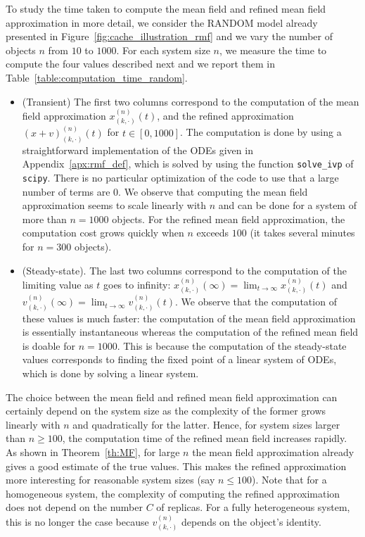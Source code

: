 \documentclass[acmsmall]{acmart}
\newcommand\toN{^{(n)}}
\begin{document}
To study the time taken to compute the mean field and refined mean field approximation in more detail, we consider the RANDOM model already presented in Figure~\ref{fig:cache_illustration_rmf} and we vary the number of objects $n$ from $10$ to $1000$. For each system size $n$, we measure the time to compute the four values described next and we report them in Table~\ref{table:computation_time_random}. 
\begin{itemize}[wide, labelwidth=!, labelindent=0pt]
  \item (Transient) The first two columns correspond to the computation of the mean field approximation $x\toN_{(k,\cdot)}(t)$, and the refined approximation $(x+v)\toN_{(k,\cdot)}(t)$ for $t\in[0,1000]$. The computation is done by using a straightforward implementation of the ODEs given in Appendix~\ref{apx:rmf_def}, which is solved by using the function \texttt{solve\_ivp} of \texttt{scipy}. There is no particular optimization of the code to use that a large number of terms are $0$. We observe that computing the mean field approximation seems to scale linearly with $n$ and can be done for a system of more than $n=1000$ objects. For the refined mean field approximation, the computation cost grows quickly when $n$ exceeds $100$ (it takes several minutes for $n=300$ objects).
  \item (Steady-state). The last two columns correspond to the computation of the limiting value as $t$ goes to infinity: $x\toN_{(k,\cdot)}(\infty) = \lim_{t\to\infty}x\toN_{(k,\cdot)}(t)$ and $v\toN_{(k,\cdot)}(\infty) = \lim_{t\to\infty}v\toN_{(k,\cdot)}(t)$. We observe that the computation of these values is much faster: the computation of the mean field approximation is essentially instantaneous whereas the computation of the refined mean field is doable for $n=1000$. This is because the computation of the steady-state values corresponds to finding the fixed point of a linear system of ODEs, which is done by solving a linear system.
\end{itemize}

The choice between the mean field and refined mean field approximation can certainly depend on the system size as the complexity of the former grows linearly with $n$ and quadratically for the latter. Hence, for system sizes larger than $n\ge 100$, the computation time of the refined mean field increases rapidly. As shown in Theorem~\ref{th:MF}, for large $n$ the mean field approximation already gives a good estimate of the true values. This makes the refined approximation more interesting for reasonable system sizes (say $n\le100$). Note that for a homogeneous system, the complexity of computing the refined approximation does not depend on the number $C$ of replicas. For a fully heterogeneous system, this is no longer the case because $v\toN_{(k,\cdot)}$ depends on the object's identity. 
\end{document}
